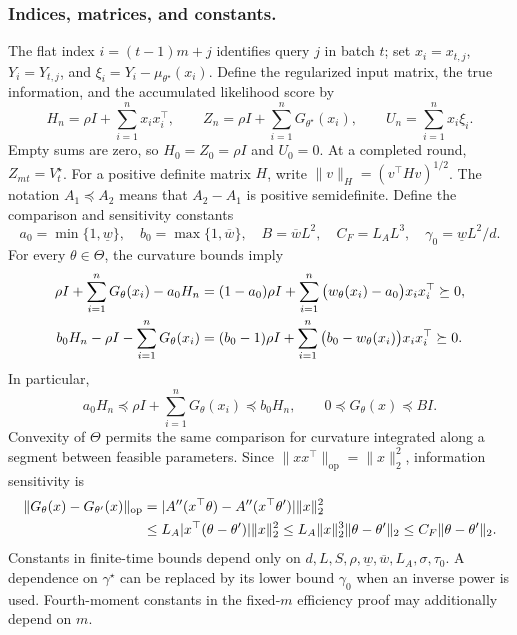 \documentclass[10pt,twoside,letterpaper]{article}
\newcommand{\op}{\mathrm{op}}
\newcommand{\norm}[1]{\lVert #1\rVert}
\begin{document}
\subsubsection*{Indices, matrices, and constants.}
The flat index $i=(t-1)m+j$ identifies query $j$ in batch $t$; set
$x_i=x_{t,j}$, $Y_i=Y_{t,j}$, and
$\xi_i=Y_i-\mu_{\theta^\star}(x_i)$. Define the regularized input
matrix, the true information, and the accumulated likelihood score by
\begin{equation}
H_n=\rho I+\sum_{i=1}^n x_ix_i^\top,\qquad
Z_n=\rho I+\sum_{i=1}^nG_{\theta^\star}(x_i),\qquad
U_n=\sum_{i=1}^n x_i\xi_i.
\label{eq:app-states}
\end{equation}
Empty sums are zero, so $H_0=Z_0=\rho I$ and $U_0=0$.
At a completed round, $Z_{mt}=V_t^\star$. For a positive definite
matrix $H$, write $\norm{v}_H=(v^\top Hv)^{1/2}$.
The notation $A_1\preceq A_2$ means that $A_2-A_1$ is positive
semidefinite. Define the comparison and sensitivity constants
\begin{equation}
a_0=\min\{1,\underline w\},\quad
b_0=\max\{1,\overline w\},\quad
B=\overline wL^2,\quad C_F=L_AL^3,\quad
\gamma_0=\underline wL^2/d.
\label{eq:app-constants}
\end{equation}
For every $\theta\in\Theta$, the curvature bounds imply
\begin{align}
\rho I+\sum_{i=1}^nG_\theta(x_i)-a_0H_n
&=(1-a_0)\rho I+
\sum_{i=1}^n\big(w_\theta(x_i)-a_0\big)x_ix_i^\top\succeq0,\notag\\
b_0H_n-\rho I-\sum_{i=1}^nG_\theta(x_i)
&=(b_0-1)\rho I+
\sum_{i=1}^n\big(b_0-w_\theta(x_i)\big)x_ix_i^\top\succeq0.
\label{eq:app-matrix-comparison-proof}
\end{align}
In particular,
\begin{equation}
a_0H_n\preceq\rho I+\sum_{i=1}^nG_\theta(x_i)
\preceq b_0H_n,\qquad
0\preceq G_\theta(x)\preceq BI.
\label{eq:app-comparability}
\end{equation}
Convexity of $\Theta$ permits the same comparison for curvature
integrated along a segment between feasible parameters.
Since $\norm{xx^\top}_{\op}=\norm{x}_2^2$, information sensitivity is
\begin{align}
\norm{G_\theta(x)-G_{\theta'}(x)}_{\op}
&=|A''(x^\top\theta)-A''(x^\top\theta')|\norm{x}_2^2\notag\\
&\le L_A|x^\top(\theta-\theta')|\norm{x}_2^2
\le L_A\norm{x}_2^3\norm{\theta-\theta'}_2
\le C_F\norm{\theta-\theta'}_2.
\label{eq:app-fisher-lipschitz}
\end{align}
Constants in finite-time bounds depend only on
$d,L,S,\rho,\underline w,\overline w,L_A,\sigma,\tau_0$.
A dependence on $\gamma^\star$ can be replaced by its lower bound
$\gamma_0$ when an inverse power is used. Fourth-moment constants in
the fixed-$m$ efficiency proof may additionally depend on $m$.
\end{document}
